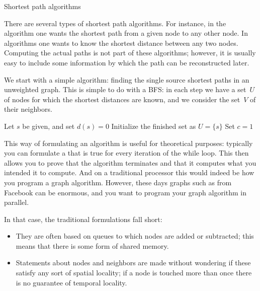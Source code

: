  {Shortest path algorithms}
\label{sec:sssp}

There are several types of shortest path algorithms. For instance,
in the  algorithm
one wants the shortest path from a given node to any other node.
In  algorithms
one wants to know the shortest distance between any two nodes.
Computing the actual paths is not part of these algorithms; 
however, it is usually easy to include some information by
which the path can be reconstructed later.

We start with a simple algorithm: finding the single source shortest
paths in an unweighted graph. This is simple to do with a \acf{BFS}:
in each step we have a set~$U$ of nodes for which the shortest distances
are known, and we consider the set~$V$ of their neighbors.

\begin{displayalgorithm}
  Let $s$ be given, and set $d(s)=0$\;
  Initialize the finished set as $U=\{s\}$\;
  Set $c=1$\;
\end{displayalgorithm}

This way of formulating an algorithm is useful for theoretical purposes:
typically you can formulate a  that is true
for every iteration of the while loop. This then allows you to prove
that the algorithm terminates and that it computes what you intended it to compute.
And on a traditional processor this would indeed be how you program 
a graph algorithm. However, these days graphs such as from Facebook 
can be enormous, and you want to program your graph algorithm in
parallel.

In that case, the traditional formulations fall short:
\begin{itemize}
\item They are often based on queues to which nodes are added or subtracted; this means
  that there is some form of shared memory.
\item Statements about nodes and neighbors are made without wondering if these
  satisfy any sort of spatial locality; if a node is touched more than once there is
  no guarantee of temporal locality.
\end{itemize}

